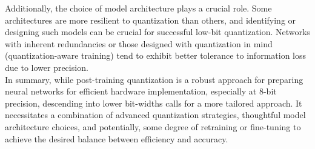\documentclass[10pt]{article}
\begin{document}
Additionally, the choice of model architecture plays a crucial role. Some architectures are more resilient to quantization than others, and identifying or designing such models can be crucial for successful low-bit quantization. Networks with inherent redundancies or those designed with quantization in mind (quantization-aware training) tend to exhibit better tolerance to information loss due to lower precision.\\

In summary, while post-training quantization is a robust approach for preparing neural networks for efficient hardware implementation, especially at 8-bit precision, descending into lower bit-widths calls for a more tailored approach. It necessitates a combination of advanced quantization strategies, thoughtful model architecture choices, and potentially, some degree of retraining or fine-tuning to achieve the desired balance between efficiency and accuracy.
\end{document}
